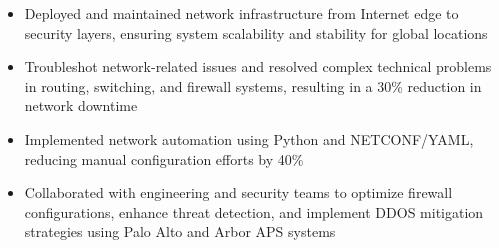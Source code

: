 \par\bigskip
{}
\par\smallskip
\begin{minipage}{13.75cm}
  \begin{minipage}{6.5cm}
    \begin{itemize}
      \item Deployed and maintained network infrastructure from Internet edge to security layers, ensuring system scalability and stability for global locations
      \item Troubleshot network-related issues and resolved complex technical problems in routing, switching, and firewall systems, resulting in a 30\% reduction in network downtime
    \end{itemize}
  \end{minipage}
  \hfill
  \begin{minipage}{6.5cm}
    \begin{itemize}
      \item Implemented network automation using Python and NETCONF/YAML, reducing manual configuration efforts by 40\%
      \item Collaborated with engineering and security teams to optimize firewall configurations, enhance threat detection, and implement DDOS mitigation strategies using Palo Alto and Arbor APS systems
    \end{itemize}
  \end{minipage}
\end{minipage}
\par\smallskip
\divider

